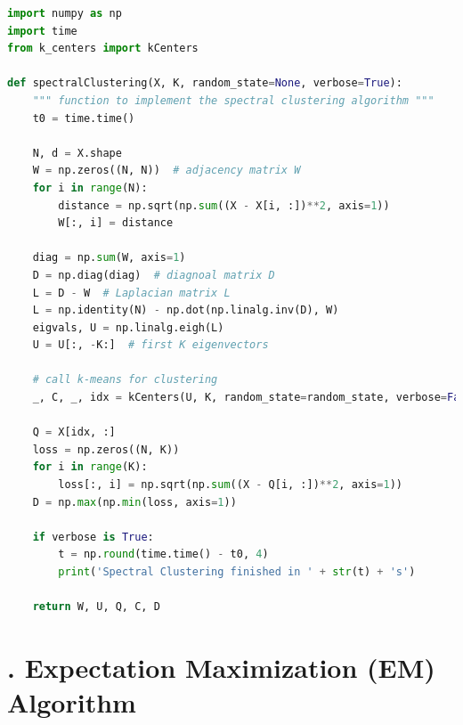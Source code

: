 \begin{lstlisting}[language=Python, caption=Spectral Clustering Algorithm Python Code]
import numpy as np
import time
from k_centers import kCenters

def spectralClustering(X, K, random_state=None, verbose=True):
    """ function to implement the spectral clustering algorithm """
    t0 = time.time()

    N, d = X.shape
    W = np.zeros((N, N))  # adjacency matrix W
    for i in range(N):
        distance = np.sqrt(np.sum((X - X[i, :])**2, axis=1))
        W[:, i] = distance

    diag = np.sum(W, axis=1)
    D = np.diag(diag)  # diagnoal matrix D
    L = D - W  # Laplacian matrix L
    L = np.identity(N) - np.dot(np.linalg.inv(D), W)
    eigvals, U = np.linalg.eigh(L)
    U = U[:, -K:]  # first K eigenvectors

    # call k-means for clustering
    _, C, _, idx = kCenters(U, K, random_state=random_state, verbose=False)

    Q = X[idx, :]
    loss = np.zeros((N, K))
    for i in range(K):
        loss[:, i] = np.sqrt(np.sum((X - Q[i, :])**2, axis=1))
    D = np.max(np.min(loss, axis=1))

    if verbose is True:
        t = np.round(time.time() - t0, 4)
        print('Spectral Clustering finished in ' + str(t) + 's')

    return W, U, Q, C, D
\end{lstlisting}


\section*{\Large {}. Expectation Maximization (EM) Algorithm}

